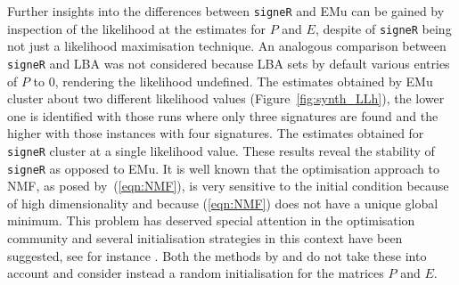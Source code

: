 \documentclass{bioinfo}
\begin{document}
Further insights into the differences between \texttt{signeR} and EMu
can be gained by inspection of the likelihood at the estimates for $P$
and $E$, despite of \texttt{signeR} being not just a likelihood
maximisation technique. An analogous comparison between
\texttt{signeR} and LBA was not considered because LBA sets by default
various entries of $P$ to 0, rendering the likelihood undefined. The
estimates obtained by EMu cluster about two different likelihood
values (Figure~\ref{fig:synth_LLh}), the lower one is identified with
those runs where only three signatures are found and the higher with
those instances with four signatures. The estimates obtained for
\texttt{signeR} cluster at a single likelihood value. These results
reveal the stability of \texttt{signeR} as opposed to EMu. It is well
known that the optimisation approach to NMF, as posed
by~(\ref{eqn:NMF}), is very sensitive to the initial condition because
of high dimensionality and because (\ref{eqn:NMF}) does not have a
unique global minimum. This problem has deserved special attention in
the optimisation community and several initialisation strategies in
this context have been suggested, see for instance \cite{BBLPP, BG,
LNACDarXiv}. Both the methods by \cite{FICMV} and \cite{A} do not take
these into account and consider instead a random initialisation for
the matrices $P$ and $E$.
\end{document}
